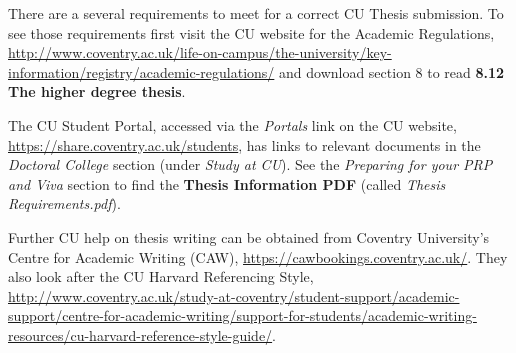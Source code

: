 There are a several requirements to meet for a correct CU Thesis submission. To see those requirements first visit the CU website for the Academic Regulations, \url{http://www.coventry.ac.uk/life-on-campus/the-university/key-information/registry/academic-regulations/} and download section 8 to read \textbf{8.12 The higher degree thesis}. 

The CU Student Portal, accessed via the \emph{Portals} link on the CU website, \url{https://share.coventry.ac.uk/students}, has links to relevant documents in the \emph{Doctoral College} section (under \emph{Study at CU}). See the \emph{Preparing for your PRP and Viva} section to find the \textbf{Thesis Information PDF} (called \emph{Thesis Requirements.pdf}).

Further CU help on thesis writing can be obtained from Coventry University's Centre for Academic Writing (CAW), \url{https://cawbookings.coventry.ac.uk/}. They also look after the CU Harvard Referencing Style, \url{http://www.coventry.ac.uk/study-at-coventry/student-support/academic-support/centre-for-academic-writing/support-for-students/academic-writing-resources/cu-harvard-reference-style-guide/}.

